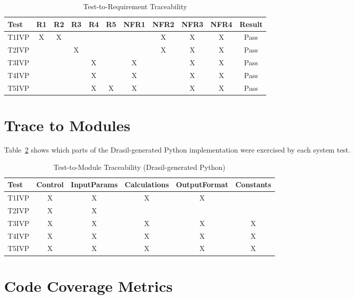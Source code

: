 \documentclass[12pt, titlepage]{article}
\begin{document}
\begin{table}[h!]
\centering
\renewcommand{\arraystretch}{1.2}
\begin{tabular}{lcccccccccc}
\toprule
\textbf{Test} & \textbf{R1} & \textbf{R2} & \textbf{R3} & \textbf{R4} &
\textbf{R5} & \textbf{NFR1} & \textbf{NFR2} & \textbf{NFR3} & \textbf{NFR4} &
\textbf{Result} \\
\midrule
T1IVP  & X & X &   &   &   &   & X & X & X & Pass \\
T2IVP  &   &   & X &   &   &   & X & X & X & Pass \\
T3IVP  &   &   &   & X &   & X &   & X & X & Pass \\
T4IVP  &   &   &   & X &   & X &   & X & X & Pass \\
T5IVP  &   &   &   & X & X & X &   & X & X & Pass \\
\bottomrule
\end{tabular}
\caption{Test-to-Requirement Traceability}
\label{tab:test-req-trace}
\end{table}

\section{Trace to Modules}

Table~\ref{tab:test-mod-trace} shows which parts of the Drasil-generated Python
implementation were exercised by each system test.

\begin{table}[h!]
\centering
\renewcommand{\arraystretch}{1.2}
\begin{tabular}{lccccc}
\toprule
\textbf{Test} & \textbf{Control} & \textbf{InputParams} &
\textbf{Calculations} & \textbf{OutputFormat} & \textbf{Constants} \\
\midrule
T1IVP  & X & X & X & X &   \\
T2IVP  & X & X &   &   &   \\
T3IVP  & X & X & X & X & X \\
T4IVP  & X & X & X & X & X \\
T5IVP  & X & X & X & X & X \\
\bottomrule
\end{tabular}
\caption{Test-to-Module Traceability (Drasil-generated Python)}
\label{tab:test-mod-trace}
\end{table}

\section{Code Coverage Metrics}
\end{document}
